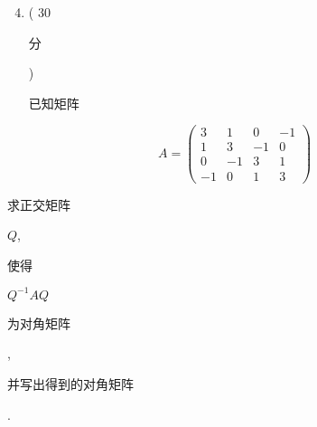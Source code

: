 \documentclass[10pt]{article}
\begin{document}
\begin{enumerate}
  \setcounter{enumi}{3}
  \item ( 30 \begin{CJK}{UTF8}{mj}分\end{CJK}) \begin{CJK}{UTF8}{mj}已知矩阵\end{CJK}
\end{enumerate}
$$
A=\left(\begin{array}{cccc}
3 & 1 & 0 & -1 \\
1 & 3 & -1 & 0 \\
0 & -1 & 3 & 1 \\
-1 & 0 & 1 & 3
\end{array}\right)
$$
\begin{CJK}{UTF8}{mj}求正交矩阵\end{CJK} $Q$, \begin{CJK}{UTF8}{mj}使得\end{CJK} $Q^{-1} A Q$ \begin{CJK}{UTF8}{mj}为对角矩阵\end{CJK}, \begin{CJK}{UTF8}{mj}并写出得到的对角矩阵\end{CJK}.
\end{document}

